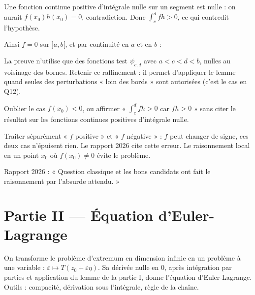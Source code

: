 \documentclass[11pt,a4paper]{article}
\newcommand{\equationajustee}[1]{%
  \sbox{\boiteequation}{$\displaystyle #1$}%
  \ifdim\wd\boiteequation>\linewidth
    \[\resizebox{\linewidth}{!}{\usebox{\boiteequation}}\]%
  \else
    \[#1\]%
  \fi}
\begin{document}
Une fonction continue positive d'intégrale nulle sur un segment est nulle : on aurait \(f(x_0)h(x_0)=0\), contradiction. Donc \(\int_c^dfh>0\), ce qui contredit l'hypothèse.

Ainsi \(f=0\) sur \(]a,b[\), et par continuité en \(a\) et en \(b\) :
\equationajustee{\boxed{f=0\ \text{sur}\ [a,b].}}

\begin{methode}

La preuve n'utilise que des fonctions test \(\psi_{c,d}\) avec \(a<c<d<b\), nulles au voisinage des bornes. Retenir ce raffinement : il permet d'appliquer le lemme quand seules des perturbations « loin des bords » sont autorisées (c'est le cas en Q12).

\end{methode}

\begin{piege}

Oublier le cas \(f(x_0)<0\), ou affirmer « \(\int_c^dfh>0\) car \(fh>0\) » sans citer le résultat sur les fonctions continues positives d'intégrale nulle.

\end{piege}

\begin{piege}

Traiter séparément « \(f\) positive » et « \(f\) négative » : \(f\) peut changer de signe, ces deux cas n'épuisent rien. Le rapport 2026 cite cette erreur. Le raisonnement local en un point \(x_0\) où \(f(x_0)\ne0\) évite le problème.

\end{piege}

\begin{jury}

Rapport 2026 : « Question classique et les bons candidats ont fait le raisonnement par l'absurde attendu. »

\end{jury}

\hypertarget{partie-ii-uxe9quation-deuler-lagrange}{%
\section{Partie II --- Équation d'Euler-Lagrange}\label{partie-ii-uxe9quation-deuler-lagrange}}

On transforme le problème d'extremum en dimension infinie en un problème à une variable : \(\varepsilon\mapsto T(z_0+\varepsilon\eta)\). Sa dérivée nulle en \(0\), après intégration par parties et application du lemme de la partie I, donne l'équation d'Euler-Lagrange. Outils : compacité, dérivation sous l'intégrale, règle de la chaîne.
\end{document}
